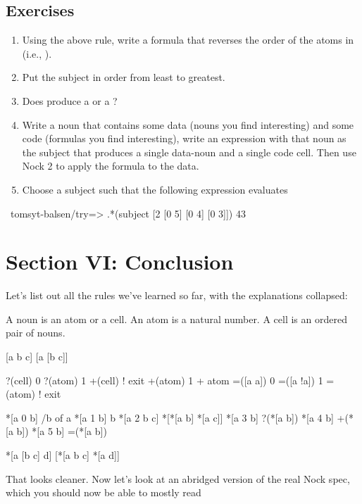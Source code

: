 \subsection{Exercises}

\begin{enumerate}
\item Using the above rule, write a formula that reverses the order of the atoms in \kode{[42 46 [68 69] 55]} (i.e., \kode{[55 [68 69] 46 42]}).
\item Put the subject \kode{[4 3 7 2 5 1 6]} in order from least to greatest.
\item Does \kode{*[[42 42] 5 [0 1] [0 3]]} produce a  or a ?
\item Write a noun that contains some data (nouns you find interesting) and some code (formulas you find interesting), write an expression with that noun as the subject that produces a single data-noun and a single code cell. Then use Nock 2 to apply the formula to the data.
\item Choose a subject such that the following expression evaluates
\end{enumerate}

\begin{code}
~tomsyt-balsen/try=> .*(subject [2 [0 5] [0 4] [0 3]])
43
\end{code}

\section{Section VI: Conclusion}

Let's list out all the rules we've learned so far, with the explanations collapsed:

\begin{code}
A noun is an atom or a cell.
An atom is a natural number.
A cell is an ordered pair of nouns.


[a b c]              [a [b c]]

?(cell)               0
?(atom)               1
+(cell)               ! exit
+(atom)               1 + atom
=([a a])              0
=([a !a])              1
=(atom)               ! exit


*[a 0 b]              /b of a
*[a 1 b]              b
*[a 2 b c]            *[*[a b] *[a c]]
*[a 3 b]              ?(*[a b])
*[a 4 b]              +(*[a b])
*[a 5 b]              =(*[a b])

*[a [b c] d]          [*[a b c] *[a d]]

\end{code}
That looks cleaner. Now let's look at an abridged version of the real Nock spec, which you should now be able to mostly read

